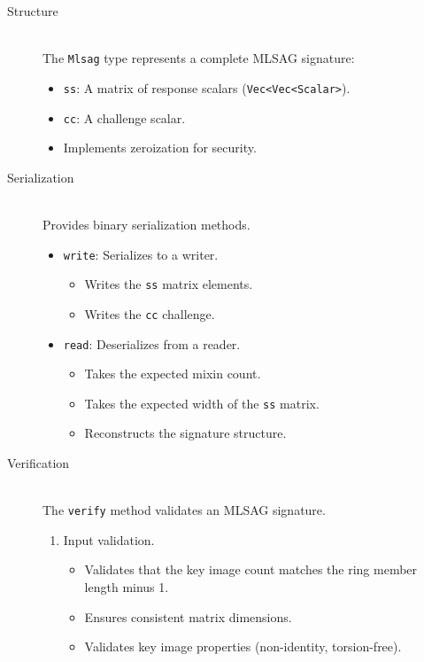 \documentclass[12pt,a4paper]{article}
\begin{document}
\begin{description}
\item[Structure] \hfill \\
The \texttt{Mlsag} type represents a complete MLSAG signature:
\begin{itemize}
\item \texttt{ss}: A matrix of response scalars (\texttt{Vec<Vec<Scalar>}).
\item \texttt{cc}: A challenge scalar.
\item Implements zeroization for security.
\end{itemize}

\item[Serialization] \hfill \\
Provides binary serialization methods.
\begin{itemize}
\item \texttt{write}: Serializes to a writer. %
  \begin{itemize}
  \item Writes the \texttt{ss} matrix elements.
  \item Writes the \texttt{cc} challenge.
  \end{itemize}
\item \texttt{read}: Deserializes from a reader. %
  \begin{itemize}
  \item Takes the expected mixin count.
  \item Takes the expected width of the \texttt{ss} matrix.
  \item Reconstructs the signature structure.
  \end{itemize}
\end{itemize}

\item[Verification] \hfill \\
The \texttt{verify} method validates an MLSAG signature.
\begin{enumerate}
\item Input validation.
  \begin{itemize}
  \item Validates that the key image count matches the ring member length minus 1.
  \item Ensures consistent matrix dimensions.
  \item Validates key image properties (non-identity, torsion-free).
  \end{itemize}


\end{enumerate}
\end{description}
\end{document}
